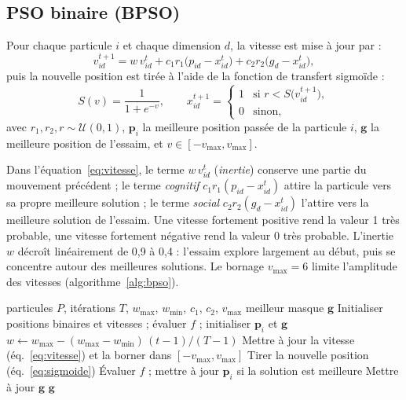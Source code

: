 \documentclass[11pt,a4paper]{report}
\begin{document}
\subsection{PSO binaire (BPSO)}
Pour chaque particule $i$ et chaque dimension $d$, la vitesse est mise à jour par :
\begin{equation}
v_{id}^{t+1} = w\, v_{id}^{t}
             + c_1 r_1 \bigl(p_{id} - x_{id}^{t}\bigr)
             + c_2 r_2 \bigl(g_{d} - x_{id}^{t}\bigr),
\label{eq:vitesse}
\end{equation}
puis la nouvelle position est tirée à l'aide de la fonction de transfert sigmoïde :
\begin{equation}
S(v) = \frac{1}{1 + e^{-v}}, \qquad
x_{id}^{t+1} =
\begin{cases}
1 & \text{si } r < S\bigl(v_{id}^{t+1}\bigr),\\
0 & \text{sinon},
\end{cases}
\label{eq:sigmoide}
\end{equation}
avec $r_1, r_2, r \sim \mathcal{U}(0,1)$, $\mathbf{p}_{i}$ la meilleure position passée de la
particule $i$, $\mathbf{g}$ la meilleure position de l'essaim, et $v \in [-v_{\max}, v_{\max}]$.

Dans l'équation~\eqref{eq:vitesse}, le terme $w\,v_{id}^{t}$ (\emph{inertie}) conserve une partie
du mouvement précédent ; le terme \emph{cognitif} $c_1 r_1 (p_{id} - x_{id}^{t})$ attire la
particule vers sa propre meilleure solution ; le terme \emph{social} $c_2 r_2 (g_{d} - x_{id}^{t})$
l'attire vers la meilleure solution de l'essaim. Une vitesse fortement positive rend la valeur 1
très probable, une vitesse fortement négative rend la valeur 0 très probable. L'inertie $w$
décroît linéairement de 0,9 à 0,4 : l'essaim explore largement au début, puis se concentre
autour des meilleures solutions. Le bornage $v_{\max} = 6$ limite l'amplitude des vitesses
(algorithme~\ref{alg:bpso}).

\begin{algorithm}[H]
\caption{PSO binaire pour la sélection de variables}
\label{alg:bpso}
\begin{algorithmic}[1]
\Require particules $P$, itérations $T$, $w_{\max}$, $w_{\min}$, $c_1$, $c_2$, $v_{\max}$
\Ensure meilleur masque $\mathbf{g}$
\State Initialiser positions binaires et vitesses ; évaluer $f$ ; initialiser $\mathbf{p}_i$ et $\mathbf{g}$
  \State $w \gets w_{\max} - (w_{\max} - w_{\min})\,(t-1)/(T-1)$
    \State Mettre à jour la vitesse (éq.~\ref{eq:vitesse}) et la borner dans $[-v_{\max}, v_{\max}]$
    \State Tirer la nouvelle position (éq.~\ref{eq:sigmoide})
    \State Évaluer $f$ ; mettre à jour $\mathbf{p}_i$ si la solution est meilleure
  \EndFor
  \State Mettre à jour $\mathbf{g}$
\EndFor
\State \Return $\mathbf{g}$
\end{algorithmic}
\end{algorithm}
\end{document}

